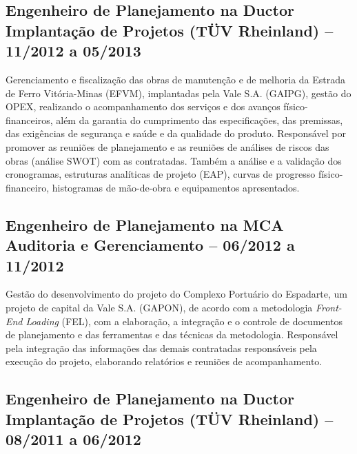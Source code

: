 \documentclass[]{article}
\begin{document}
\subsection{Engenheiro de Planejamento na Ductor Implantação de Projetos
(TÜV Rheinland) -- 11/2012 a
05/2013}\label{engenheiro-de-planejamento-na-ductor-implantauxe7uxe3o-de-projetos-tuxfcv-rheinland-112012-a-052013}

Gerenciamento e fiscalização das obras de manutenção e de melhoria da
Estrada de Ferro Vitória-Minas (EFVM), implantadas pela Vale S.A.
(GAIPG), gestão do OPEX, realizando o acompanhamento dos serviços e dos
avanços físico-financeiros, além da garantia do cumprimento das
especificações, das premissas, das exigências de segurança e saúde e da
qualidade do produto. Responsável por promover as reuniões de
planejamento e as reuniões de análises de riscos das obras (análise
SWOT) com as contratadas. Também a análise e a validação dos
cronogramas, estruturas analíticas de projeto (EAP), curvas de progresso
físico-financeiro, histogramas de mão-de-obra e equipamentos
apresentados.

\subsection{Engenheiro de Planejamento na MCA Auditoria e Gerenciamento
-- 06/2012 a
11/2012}\label{engenheiro-de-planejamento-na-mca-auditoria-e-gerenciamento-062012-a-112012}

Gestão do desenvolvimento do projeto do Complexo Portuário do Espadarte,
um projeto de capital da Vale S.A. (GAPON), de acordo com a metodologia
\emph{Front-End Loading} (FEL), com a elaboração, a integração e o
controle de documentos de planejamento e das ferramentas e das técnicas
da metodologia. Responsável pela integração das informações das demais
contratadas responsáveis pela execução do projeto, elaborando relatórios
e reuniões de acompanhamento.

\subsection{Engenheiro de Planejamento na Ductor Implantação de Projetos
(TÜV Rheinland) -- 08/2011 a
06/2012}\label{engenheiro-de-planejamento-na-ductor-implantauxe7uxe3o-de-projetos-tuxfcv-rheinland-082011-a-062012}
\end{document}
